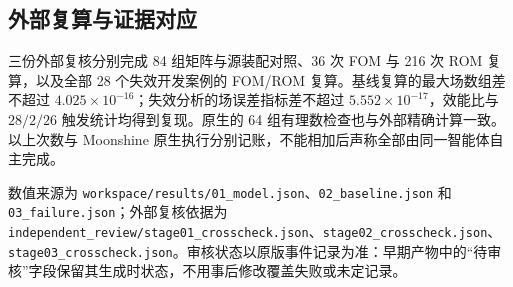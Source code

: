 \subsection{外部复算与证据对应}
三份外部复核分别完成 84 组矩阵与源装配对照、36 次 FOM 与 216 次 ROM 复算，以及全部 28 个失效开发案例的 FOM/ROM 复算。基线复算的最大场数组差不超过 $4.025\times10^{-16}$；失效分析的场误差指标差不超过 $5.552\times10^{-17}$，效能比与 $28/2/26$ 触发统计均得到复现。原生的 64 组有理数检查也与外部精确计算一致。以上次数与 Moonshine 原生执行分别记账，不能相加后声称全部由同一智能体自主完成。

数值来源为 \texttt{workspace/results/01\_model.json}、\texttt{02\_baseline.json} 和 \texttt{03\_failure.json}；外部复核依据为 \texttt{independent\_review/stage01\_crosscheck.json}、\texttt{stage02\_crosscheck.json}、\texttt{stage03\_crosscheck.json}。审核状态以原版事件记录为准：早期产物中的“待审核”字段保留其生成时状态，不用事后修改覆盖失败或未定记录。
